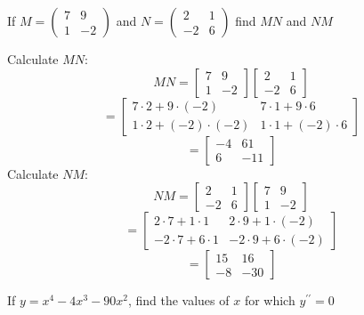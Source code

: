 \documentclass[a4paper, 12pt]{report}
\def\ni{blue!20!white}
\begin{document}
    \newpage
    \begin{tcolorbox}[title=\color{black}{\section{Q8}}, colback=white, colframe=\ni, boxrule=1mm, width=1\textwidth]
        If \( M=\left(\begin{array}{cc}7 & 9 \\ 1 & -2\end{array}\right) \) and \( N=\left(\begin{array}{cc}2 & 1 \\ -2 & 6\end{array}\right) \) find \( M N \) and \( N M \)
    \end{tcolorbox}
    
    Calculate \( MN \):
    \[MN = \begin{bmatrix} 7 & 9 \\ 1 & -2 \end{bmatrix} \begin{bmatrix} 2 & 1 \\ -2 & 6 \end{bmatrix}\]
    \[= \begin{bmatrix} 7 \cdot 2 + 9 \cdot (-2) & 7 \cdot 1 + 9 \cdot 6 \\ 1 \cdot 2 + (-2) \cdot (-2) & 1 \cdot 1 + (-2) \cdot 6 \end{bmatrix}\]
    \[\boxed{= \begin{bmatrix} -4 & 61 \\ 6 & -11 \end{bmatrix}}\]
    Calculate \( NM \):
    \[NM = \begin{bmatrix} 2 & 1 \\ -2 & 6 \end{bmatrix} \begin{bmatrix} 7 & 9 \\ 1 & -2 \end{bmatrix}\]
    \[= \begin{bmatrix} 2 \cdot 7 + 1 \cdot 1 & 2 \cdot 9 + 1 \cdot (-2) \\ -2 \cdot 7 + 6 \cdot 1 & -2 \cdot 9 + 6 \cdot (-2) \end{bmatrix}\]
    \[\boxed{= \begin{bmatrix} 15 & 16 \\ -8 & -30 \end{bmatrix}}\]
    
    \newpage
    \begin{tcolorbox}[title=\color{black}{\section{Q9}}, colback=white, colframe=\ni, boxrule=1mm, width=1\textwidth]
        If \( y=x^{4}-4 x^{3}-90 x^{2} \), find the values of \( x \) for which \( y^{\prime \prime}=0 \)
    \end{tcolorbox}
    
\end{document}
